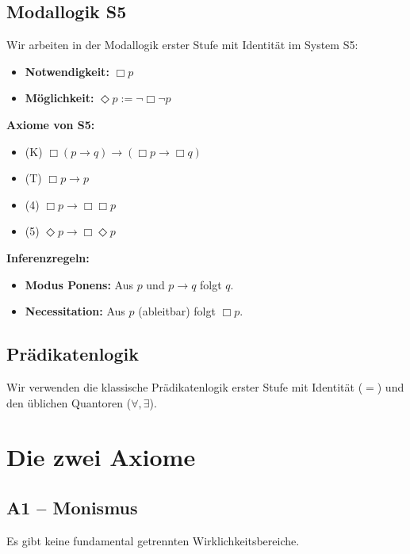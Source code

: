 \documentclass[
]{article}
\begin{document}
\subsection{Modallogik S5}\label{modallogik-s5}

Wir arbeiten in der Modallogik erster Stufe mit Identität im System S5:

\begin{itemize}
\item \textbf{Notwendigkeit:} \(\Box p\)
\item \textbf{Möglichkeit:} \(\Diamond p := \neg\Box\neg p\)
\end{itemize}

\textbf{Axiome von S5:}
\begin{itemize}
\item (K) \(\Box(p \rightarrow q) \rightarrow (\Box p \rightarrow \Box q)\)
\item (T) \(\Box p \rightarrow p\)
\item (4) \(\Box p \rightarrow \Box\Box p\)
\item (5) \(\Diamond p \rightarrow \Box\Diamond p\)
\end{itemize}

\textbf{Inferenzregeln:}
\begin{itemize}
\item \textbf{Modus Ponens:} Aus \(p\) und \(p \rightarrow q\) folgt \(q\).
\item \textbf{Necessitation:} Aus \(p\) (ableitbar) folgt \(\Box p\).
\end{itemize}

\subsection{Prädikatenlogik}\label{pruxe4dikatenlogik}

Wir verwenden die klassische Prädikatenlogik erster Stufe mit Identität (\(=\)) und den üblichen Quantoren (\(\forall, \exists\)).

\section{Die zwei Axiome}\label{die-zwei-axiome}

\subsection{A1 – Monismus}\label{a1-monismus}

Es gibt keine fundamental getrennten Wirklichkeitsbereiche.
\end{document}
